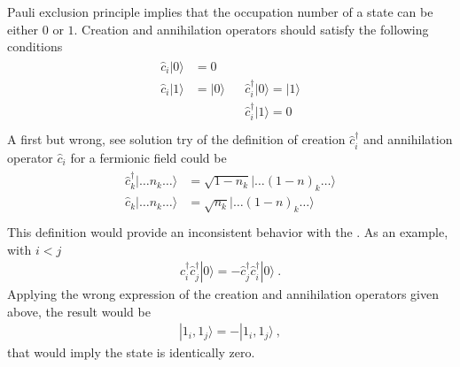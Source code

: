 \documentclass[letterpaper,10pt,english]{jupyterBook}
\begin{document}
\sphinxAtStartPar
{} Pauli exclusion principle implies that the occupation number of a state can be either \(0\) or \(1\). Creation and annihilation operators should satisfy the following conditions
\begin{equation*}
\begin{split}\begin{aligned}
  \hat{c}_i | 0 \rangle & =   0         &&                                \\
  \hat{c}_i | 1 \rangle & = | 0 \rangle && \hat{c}_i^\dagger | 0 \rangle = | 1 \rangle \\
                        &               && \hat{c}_i^\dagger | 1 \rangle = 0 \\
\end{aligned}\end{split}
\end{equation*}
\sphinxAtStartPar
A first \sphinxhyphen{} but wrong, see  solution \sphinxhyphen{} try of the definition of creation \(\hat{c}_i^\dagger\) and annihilation operator \(\hat{c}_i\) for a fermionic field could be
\begin{equation*}
\begin{split}\begin{aligned}
  \hat{c}_k^\dagger | \dots n_k \dots \rangle & = \sqrt{1-n_k} | \dots (1-n)_k \dots \rangle \\
  \hat{c}_k         | \dots n_k \dots \rangle & = \sqrt{  n_k} | \dots (1-n)_k \dots \rangle \\
\end{aligned}\end{split}
\end{equation*}
\sphinxAtStartPar
This definition would provide an inconsistent behavior with the {\hyperref[\detokenize{ch/quantum-mechanics/many-body/fermions:quantum-mechanics-second-quantizazion-fermions-car}]{}}. As an example, with \(i < j\)
\begin{equation*}
\begin{split}\hat{c}_i^\dagger \hat{c}_j^\dagger | 0 \rangle = - \hat{c}_j^\dagger \hat{c}_i^\dagger | 0 \rangle \ .\end{split}
\end{equation*}
\sphinxAtStartPar
Applying the \sphinxhyphen{} wrong \sphinxhyphen{} expression of the creation and annihilation operators given above, the result would be
\begin{equation*}
\begin{split}| 1_i, 1_j \rangle = - | 1_i, 1_j \rangle \ ,\end{split}
\end{equation*}
\sphinxAtStartPar
that would imply the state is identically zero.
\end{document}
